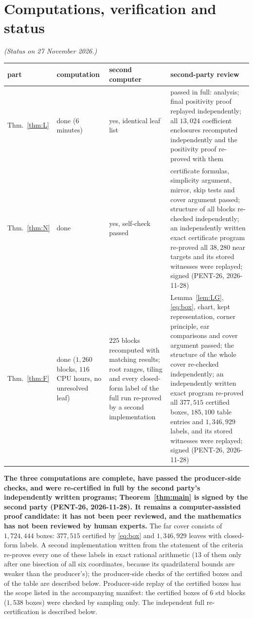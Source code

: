 \documentclass[11pt]{article}
\theoremstyle{remark}
\begin{document}
\section{Computations, verification and status}\label{sec:status}
\emph{(Status on 27 November 2026.)}
\begin{center}\small
\begin{tabular}{@{}lp{3.1cm}p{3.6cm}p{5.8cm}@{}}\toprule
part & computation & second computer & second-party review\\\midrule
Thm.~\ref{thm:L} & done ($6$ minutes) & yes, identical leaf list & passed in full: analysis; final positivity proof replayed independently; all $13{,}024$ coefficient enclosures recomputed independently and the positivity proof re-proved with them\\
Thm.~\ref{thm:N} & done & yes, self-check passed & certificate formulas, simplicity argument, mirror, skip tests and cover argument passed; structure of all blocks re-checked independently; an independently written exact certificate program re-proved all $38{,}280$ near targets and its stored witnesses were replayed; signed (PENT-26, 2026-11-28)\\
Thm.~\ref{thm:F} & done ($1{,}260$ blocks, $116$ CPU hours, no unresolved leaf) & $225$ blocks recomputed with matching results; root ranges, tiling and every closed-form label of the full run re-proved by a second implementation & Lemma~\ref{lem:LG}, \eqref{eq:box}, chart, kept representation, corner principle, ear comparisons and cover argument passed; the structure of the whole cover re-checked independently; an independently written exact program re-proved all $377{,}515$ certified boxes, $185{,}100$ table entries and $1{,}346{,}929$ labels, and its stored witnesses were replayed; signed (PENT-26, 2026-11-28)\\\bottomrule
\end{tabular}\end{center}
\noindent\textbf{The three computations are complete, have passed the producer-side checks, and were re-certified in full
by the second party's independently written programs; Theorem~\ref{thm:main} is signed by the second party (PENT-26, 2026-11-28).
It remains a computer-assisted proof candidate: it has not been peer reviewed, and the mathematics has not been
reviewed by human experts.}
The far cover consists of $1{,}724{,}444$ boxes: $377{,}515$ certified by \eqref{eq:box} and $1{,}346{,}929$ leaves with
closed-form labels. A second implementation written from the statement of the criteria re-proves every one of these
labels in exact rational arithmetic ($13$ of them only after one bisection of all six coordinates, because its
quadrilateral bounds are weaker than the producer's); the producer-side checks of the certified boxes and of the table
are described below. Producer-side replay of the certified boxes has the scope listed in the accompanying
manifest: the certified boxes of $6$ std blocks ($1{,}538$ boxes) were checked by sampling only. The independent full
re-certification is described below.
\end{document}
